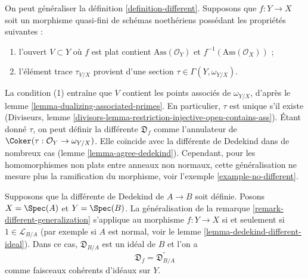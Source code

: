 \begin{remark}
\label{remark-different-generalization}
On peut généraliser la définition \ref{definition-different}.
Supposons que $f : Y \to X$ soit un morphisme quasi-fini de schémas noethériens
possédant les propriétés suivantes :
\begin{enumerate}
\item l'ouvert $V \subset Y$ où $f$ est plat contient
$\text{Ass}(\mathcal{O}_Y)$ et $f^{-1}(\text{Ass}(\mathcal{O}_X))$ ;
\item l'élément trace $\tau_{V/X}$ provient d'une section
$\tau \in \Gamma(Y, \omega_{Y/X})$.
\end{enumerate}
La condition (1) entraîne que $V$ contient les points associés de
$\omega_{Y/X}$, d'après le lemme \ref{lemma-dualizing-associated-primes}.
En particulier, $\tau$ est unique s'il existe
(Diviseurs, lemme \ref{divisors-lemma-restriction-injective-open-contains-ass}).
Étant donné $\tau$, on peut définir la différente $\mathfrak{D}_f$ comme l'annulateur de
$\Coker(\tau : \mathcal{O}_Y \to \omega_{Y/X})$. Elle coïncide avec la
différente de Dedekind dans de nombreux cas (lemme \ref{lemma-agree-dedekind}).
Cependant, pour les homomorphismes non plats entre anneaux non normaux, cette généralisation
ne mesure plus la ramification du morphisme, voir
l'exemple \ref{example-no-different}.
\end{remark}

\begin{lemma}
\label{lemma-agree-dedekind}
Supposons que la différente de Dedekind de $A \to B$ soit définie.
Posons $X = \Spec(A)$ et $Y = \Spec(B)$. La généralisation de la
remarque \ref{remark-different-generalization}
s'applique au morphisme $f : Y \to X$ si et seulement si
$1 \in \mathcal{L}_{B/A}$ (par exemple si $A$ est normal, voir le
lemme \ref{lemma-dedekind-different-ideal}).
Dans ce cas, $\mathfrak{D}_{B/A}$ est un idéal de $B$ et l'on a
$$
\mathfrak{D}_f = \widetilde{\mathfrak{D}_{B/A}}
$$
comme faisceaux cohérents d'idéaux sur $Y$.
\end{lemma}

